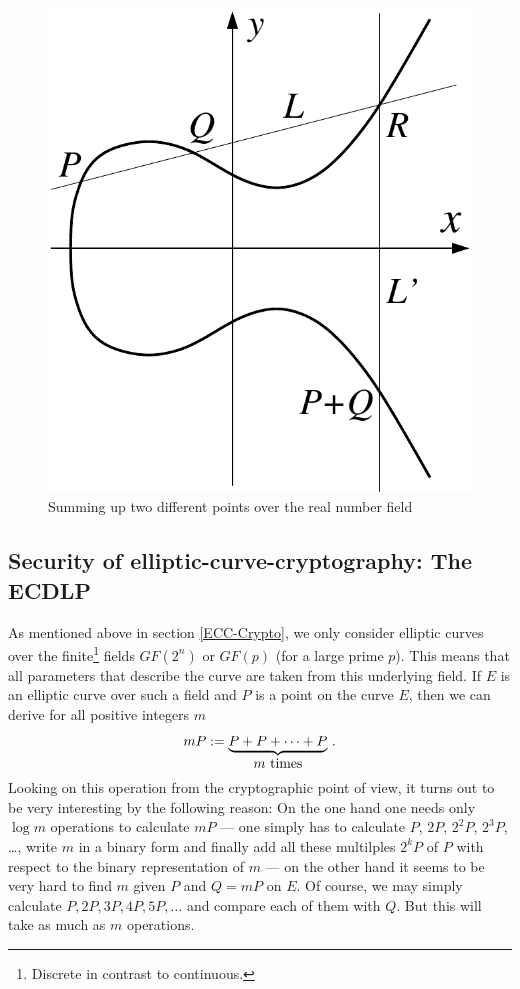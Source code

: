 \begin{figure}[htbp]
\begin{center}
\includegraphics[scale=0.65]{figures/ec-add}
\caption{Summing up two different points over the real number field} %
\end{center}
\end{figure}
\enlargethispage{+20pt}
\newpage


\subsection{Security of elliptic-curve-cryptography: The ECDLP}

As mentioned above in section \ref{ECC-Crypto}, we only consider elliptic curves over the finite\footnote{Discrete in contrast to continuous.} fields $GF(2^n)$ or $GF(p)$ (for a large prime $p$). This means that all parameters that describe the curve are taken from this underlying field. If $E$ is an elliptic curve over such a field and $P$ is a point on the curve $E$, then we can derive for all positive integers $m$
$$ mP := \underbrace{P+P+\dots+P}_{\hbox{$m$ times}} \, .
$$
Looking on this operation from the cryptographic point of view, it turns out to be very interesting by the following reason: On the one hand one needs only $\log m$ operations to calculate $mP$ --- one simply has to calculate $P$, $2P$, $2^2P$, $2^3P$, \dots, write $m$ in a binary form and finally add all these multilples $2^kP$ of $P$ with respect to the binary representation of $m$ --- on the other hand it seems to be very hard to find $m$ given $P$ and $Q=mP$ on $E$. Of course, we may simply calculate $P,2P,3P,4P,5P,\dots$ and compare each of them with $Q$. But this will take as much as $m$ operations.

